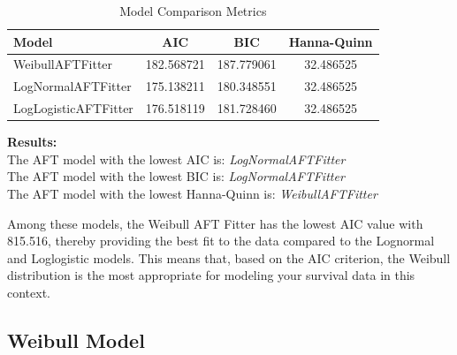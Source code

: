 \documentclass[doublespacing]{report} %
\begin{document}
\begin{table}[H]
    \centering
    \begin{tabular}{lccc}
        \toprule
        Model & AIC & BIC & Hanna-Quinn \\
        \midrule
        WeibullAFTFitter & 182.568721 & 187.779061 & 32.486525 \\
        LogNormalAFTFitter & 175.138211 & 180.348551 & 32.486525 \\
        LogLogisticAFTFitter & 176.518119 & 181.728460 & 32.486525 \\
        \bottomrule
    \end{tabular}
    \caption{Model Comparison Metrics}
    \label{tab:model_comparison}
\end{table}

\noindent
\textbf{Results:} \\
The AFT model with the lowest AIC is: \textit{LogNormalAFTFitter} \\
The AFT model with the lowest BIC is: \textit{LogNormalAFTFitter} \\
The AFT model with the lowest Hanna-Quinn is: \textit{WeibullAFTFitter}

Among these models, the Weibull AFT Fitter has the lowest AIC value with 815.516, thereby providing the best fit to the data compared to the Lognormal and Loglogistic models. This means that, based on the AIC criterion, the Weibull distribution is the most appropriate for modeling your survival data in this context.

\subsection{Weibull Model}
\end{document}
